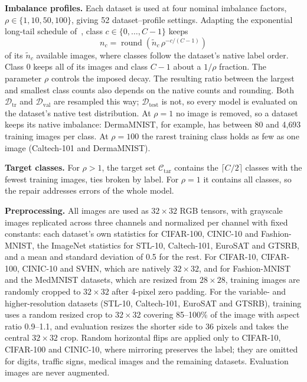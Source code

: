 \documentclass[review,number,sort&compress]{elsarticle}
\theoremstyle{definition}
\begin{document}
\textbf{Imbalance profiles.} Each dataset is used at four nominal
imbalance factors, $\rho\in\{1,10,50,100\}$, giving 52 dataset--profile
settings. Adapting the
exponential long-tail schedule of~\citep{cui2019class}, class
$c\in\{0,\ldots,C-1\}$ keeps
\begin{equation}
\label{eq:imbalance-profile}
n_c=\operatorname{round}\!\left(\widetilde n_c\,\rho^{-c/(C-1)}\right)
\end{equation}
of its $\widetilde n_c$ available images, where classes follow the
dataset's native label order. Class $0$ keeps all of its images and class
$C-1$ about a $1/\rho$ fraction. The parameter $\rho$ controls the
imposed decay. The resulting ratio between the largest and smallest
class counts also depends on the native counts and rounding.
Both $\mathcal{D}_{\mathrm{tr}}$ and $\mathcal{D}_{\mathrm{val}}$ are
resampled this way; $\mathcal{D}_{\mathrm{test}}$ is not, so every model
is evaluated on the dataset's native test distribution. At $\rho=1$ no
image is removed, so a dataset keeps its
native imbalance: DermaMNIST, for example, has between 80 and 4{,}693
training images per class. At $\rho=100$ the rarest training class holds
as few as one image (Caltech-101 and DermaMNIST).

\textbf{Target classes.} For $\rho>1$, the target set
$\mathcal{C}_{\mathrm{tar}}$ contains the $\lceil C/2\rceil$ classes with
the fewest training images, ties broken by label. For $\rho=1$ it contains
all classes, so the repair addresses errors of the whole model.

\textbf{Preprocessing.} All images are used as $32\times32$ RGB tensors,
with grayscale images replicated across three channels and normalized per
channel with fixed constants: each dataset's own statistics for
CIFAR-100, CINIC-10 and Fashion-MNIST, the ImageNet statistics for
STL-10, Caltech-101, EuroSAT and GTSRB, and a mean and standard
deviation of 0.5 for the rest. For CIFAR-10, CIFAR-100,
CINIC-10 and SVHN, which are natively $32\times32$, and for Fashion-MNIST
and the MedMNIST datasets, which are resized from $28\times28$, training
images are randomly cropped to $32\times32$ after 4-pixel zero padding.
For the variable- and higher-resolution datasets (STL-10, Caltech-101,
EuroSAT and GTSRB), training uses a random resized crop to $32\times32$
covering 85--100\% of the image with aspect ratio 0.9--1.1, and
evaluation resizes the shorter side to 36 pixels and takes the central
$32\times32$ crop. Random horizontal flips are applied only to CIFAR-10,
CIFAR-100 and CINIC-10, where mirroring preserves the label; they are
omitted for digits, traffic signs, medical images and the remaining
datasets. Evaluation images are never augmented.
\end{document}
